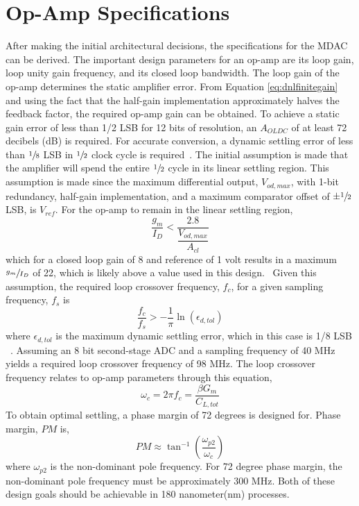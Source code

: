 \section{Op-Amp Specifications}
After making the initial architectural decisions, the specifications for the MDAC can be derived. The important design parameters for an op-amp are its loop gain, loop unity gain frequency, and its closed loop bandwidth. The loop gain of the op-amp determines the static amplifier error. From Equation \ref{eq:dnlfinitegain} and using the fact that the half-gain implementation approximately halves the feedback factor, the required op-amp gain can be obtained. To achieve a static gain error of less than 1/2 LSB for 12 bits of resolution, an $A_{OLDC}$ of at least 72 decibels (dB) is required. For accurate conversion, a dynamic settling error of less than $\sfrac{1}{8}$ LSB in $\sfrac{1}{2}$ clock cycle is required~\cite{315breader}. The initial assumption is made that the amplifier will spend the entire $\sfrac{1}{2}$ cycle in its linear settling region. This assumption is made since the maximum differential output, $V_{od,max}$, with 1-bit redundancy, half-gain implementation, and a maximum comparator offset of $\pm\sfrac{1}{2}$ LSB, is $V_{ref}$. For the op-amp to remain in the linear settling region,
\begin{equation}
\label{eq:gmidlinregion}
\dfrac{g_m}{I_D} < \dfrac{2.8}{\dfrac{V_{od,max}}{A_{cl}}}
\end{equation}
which for a closed loop gain of 8 and reference of 1 volt results in a maximum $\sfrac{g_m}{I_D}$ of 22, which is likely above a value used in this design.~\cite{315areader} Given this assumption, the required loop crossover frequency, $f_{c}$, for a given sampling frequency, $f_{s}$ is
\begin{equation}
\label{eq:reqtimeconst}
\dfrac{f_c}{f_s} > -\dfrac{1}{\pi}\ln(\epsilon_{d,tol})
\end{equation}
where $\epsilon_{d,tol}$ is the maximum dynamic settling error, which in this case is 1/8 LSB ~\cite{315areader}. Assuming an 8 bit second-stage ADC and a sampling frequency of 40 MHz yields a required loop crossover frequency of 98 MHz. The loop crossover frequency relates to op-amp parameters through this equation,
\begin{equation}
\label{eq:clbw}
\omega_c = 2\pi f_{c} = \dfrac{\beta G_{m}}{C_{L,tot}}
\end{equation}
To obtain optimal settling, a phase margin of 72 degrees is designed for. Phase margin, $PM$ is,
\begin{equation}
\label{eq:pm}
PM \approx \tan^{-1}\left(\dfrac{\omega_{p2}}{\omega_{c}}\right)
\end{equation}
where $\omega_{p2}$ is the non-dominant pole frequency. For 72 degree phase margin, the non-dominant pole frequency must be approximately 300 MHz. Both of these design goals should be achievable in 180 nanometer(nm) processes. 
